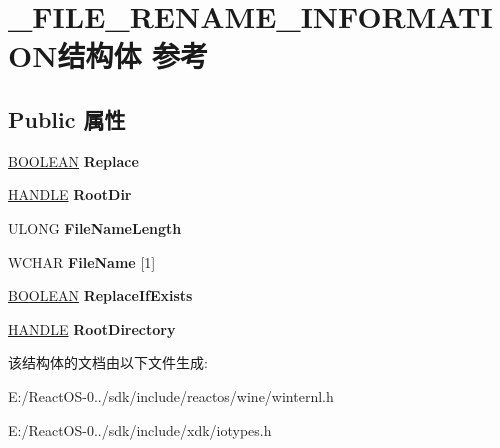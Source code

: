 \hypertarget{struct___f_i_l_e___r_e_n_a_m_e___i_n_f_o_r_m_a_t_i_o_n}{}\section{\+\_\+\+F\+I\+L\+E\+\_\+\+R\+E\+N\+A\+M\+E\+\_\+\+I\+N\+F\+O\+R\+M\+A\+T\+I\+O\+N结构体 参考}
\label{struct___f_i_l_e___r_e_n_a_m_e___i_n_f_o_r_m_a_t_i_o_n}
\subsection*{Public 属性}
\begin{DoxyCompactItemize}
\item 
\mbox{\label{struct___f_i_l_e___r_e_n_a_m_e___i_n_f_o_r_m_a_t_i_o_n_a758f8db8019360569b716d998ba5834e}} 
\hyperlink{_processor_bind_8h_a112e3146cb38b6ee95e64d85842e380a}{B\+O\+O\+L\+E\+AN} {\bfseries Replace}
\item 
\mbox{\label{struct___f_i_l_e___r_e_n_a_m_e___i_n_f_o_r_m_a_t_i_o_n_ae63a169deea1c7ee87ab3effe73dd08d}} 
\hyperlink{interfacevoid}{H\+A\+N\+D\+LE} {\bfseries Root\+Dir}
\item 
\mbox{\label{struct___f_i_l_e___r_e_n_a_m_e___i_n_f_o_r_m_a_t_i_o_n_ad323b20fdbc856ac1a29a95e1a852f79}} 
U\+L\+O\+NG {\bfseries File\+Name\+Length}
\item 
\mbox{\label{struct___f_i_l_e___r_e_n_a_m_e___i_n_f_o_r_m_a_t_i_o_n_a2e47021e961e4eeb673440277edb720b}} 
W\+C\+H\+AR {\bfseries File\+Name} \mbox{[}1\mbox{]}
\item 
\mbox{\label{struct___f_i_l_e___r_e_n_a_m_e___i_n_f_o_r_m_a_t_i_o_n_ab8819a7b60f80d986d7cc3405185ef00}} 
\hyperlink{_processor_bind_8h_a112e3146cb38b6ee95e64d85842e380a}{B\+O\+O\+L\+E\+AN} {\bfseries Replace\+If\+Exists}
\item 
\mbox{\label{struct___f_i_l_e___r_e_n_a_m_e___i_n_f_o_r_m_a_t_i_o_n_ae2c4337c13ffff77ac4bf1d46ff8d5a0}} 
\hyperlink{interfacevoid}{H\+A\+N\+D\+LE} {\bfseries Root\+Directory}
\end{DoxyCompactItemize}


该结构体的文档由以下文件生成\+:\begin{DoxyCompactItemize}
\item 
E\+:/\+React\+O\+S-\/0../sdk/include/reactos/wine/winternl.\+h\item 
E\+:/\+React\+O\+S-\/0../sdk/include/xdk/iotypes.\+h\end{DoxyCompactItemize}
